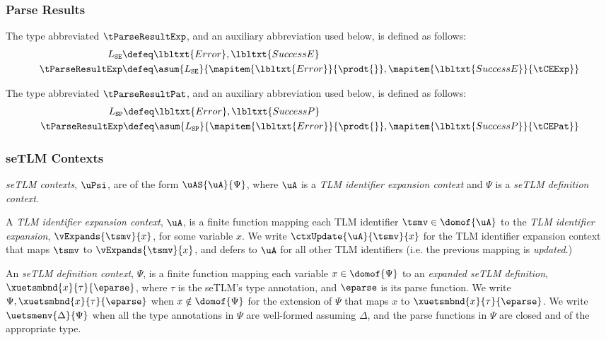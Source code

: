 \subsubsection{Parse Results}
 The type abbreviated $\tParseResultExp$, and an auxiliary abbreviation used below, is defined as follows:
\begin{align*}
L_\mathtt{SE} & \defeq \lbltxt{Error}, \lbltxt{SuccessE}\\
\tParseResultExp & \defeq \asum{L_\mathtt{SE}}{
  \mapitem{\lbltxt{Error}}{\prodt{}}, 
  \mapitem{\lbltxt{SuccessE}}{\tCEExp}
}\\
\end{align*} %

\begin{grayparbox}
 The type abbreviated $\tParseResultPat$, and an auxiliary abbreviation used below, is defined as follows:
\begin{align*}
L_\mathtt{SP} & \defeq \lbltxt{Error}, \lbltxt{SuccessP}\\
\tParseResultExp & \defeq \asum{L_\mathtt{SP}}{
  \mapitem{\lbltxt{Error}}{\prodt{}}, 
  \mapitem{\lbltxt{SuccessP}}{\tCEPat}
}\\
\end{align*} %
\end{grayparbox}

\subsubsection{seTLM Contexts}

\emph{seTLM contexts}, $\uPsi$, are of the form $\uAS{\uA}{\Psi}$, where $\uA$ is a \emph{TLM identifier expansion context} and $\Psi$ is a \emph{seTLM definition context}. 

A \emph{TLM identifier expansion context}, $\uA$, is a finite function mapping each TLM identifier $\tsmv \in \domof{\uA}$ to the \emph{TLM identifier expansion}, $\vExpands{\tsmv}{x}$, for some variable $x$. We write $\ctxUpdate{\uA}{\tsmv}{x}$ for the TLM identifier expansion context that maps $\tsmv$ to $\vExpands{\tsmv}{x}$, and defers to $\uA$ for all other TLM identifiers (i.e. the previous mapping is \emph{updated}.)

An \emph{seTLM definition context}, $\Psi$, is a finite function mapping each variable $x \in \domof{\Psi}$ to an \emph{expanded seTLM definition}, $\xuetsmbnd{x}{\tau}{\eparse}$, where $\tau$ is the seTLM's type annotation, and $\eparse$ is its parse function. We write $\Psi, \xuetsmbnd{x}{\tau}{\eparse}$ when $x \notin \domof{\Psi}$ for the extension of $\Psi$ that maps $x$ to $\xuetsmbnd{x}{\tau}{\eparse}$. We write $\uetsmenv{\Delta}{\Psi}$  when all the type annotations in $\Psi$ are well-formed assuming $\Delta$, and the parse functions in $\Psi$ are closed and of the appropriate type.

